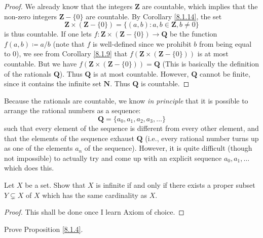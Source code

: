 \begin{proof}
    We already know that the integers \(\mathbf{Z}\) are countable, which implies that the non-zero integers \(\mathbf{Z} - \{0\}\) are countable.
    By Corollary \ref{8.1.14}, the set
    \[
        \mathbf{Z} \times (\mathbf{Z} - \{0\}) = \{(a, b) : a, b \in \mathbf{Z}, b \neq 0\}
    \]
    is thus countable.
    If one lets \(f : \mathbf{Z} \times (\mathbf{Z} - \{0\}) \to \mathbf{Q}\) be the function \(f(a, b) \coloneqq a / b\)
    (note that \(f\) is well-defined since we prohibit \(b\) from being equal to \(0\)), we see from Corollary \ref{8.1.9} that \(f(\mathbf{Z} \times (\mathbf{Z} - \{0\}))\) is at most countable.
    But we have \(f(\mathbf{Z} \times (\mathbf{Z} - \{0\})) = \mathbf{Q}\)
    (This is basically the definition of the rationals \(\mathbf{Q}\)).
    Thus \(\mathbf{Q}\) is at most countable.
    However, \(\mathbf{Q}\) cannot be finite, since it contains the infinite set \(\mathbf{N}\).
    Thus \(\mathbf{Q}\) is countable.
\end{proof}

\begin{remark}\label{8.1.16}
    Because the rationals are countable, we know \emph{in principle} that it is possible to arrange the rational numbers as a sequence:
    \[
        \mathbf{Q} = \{a_0, a_1, a_2, a_3, \dots\}
    \]
    such that every element of the sequence is different from every other element, and that the elements of the sequence exhaust \(\mathbf{Q}\)
    (i.e., every rational number turns up as one of the elements \(a_n\) of the sequence).
    However, it is quite difficult (though not impossible) to actually try and come up with an explicit sequence \(a_0, a_1, \dots\) which does this.
\end{remark}

\exercisesection

\begin{exercise}\label{ex 8.1.1}
    Let \(X\) be a set.
    Show that \(X\) is infinite if and only if there exists a proper subset \(Y \subsetneq X\) of \(X\) which has the same cardinality as \(X\).
\end{exercise}

\begin{proof}
    This shall be done once I learn Axiom of choice.
\end{proof}

\begin{exercise}\label{ex 8.1.2}
    Prove Proposition \ref{8.1.4}.
\end{exercise}

